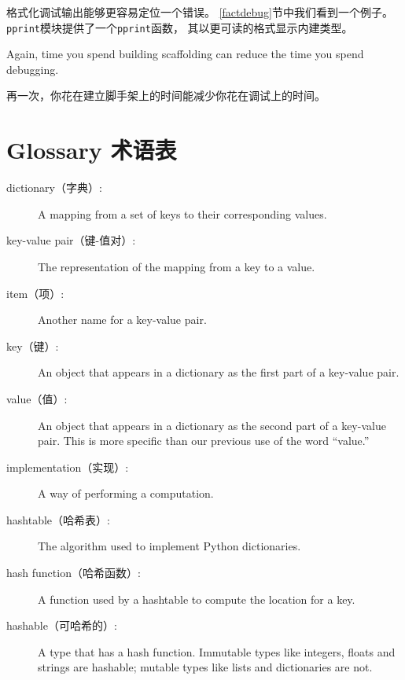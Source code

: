 \documentclass[10pt]{book}
\begin{document}
\begin{CJK}{UTF8}{gbsn}
\begin{description}
[美化打印输出：]格式化调试输出能够更容易定位一个错误。
\ref{factdebug}节中我们看到一个例子。
{\tt pprint}模块提供了一个{\tt pprint}函数，
其以更可读的格式显示内建类型。

\end{description}

Again, time you spend building scaffolding can reduce
the time you spend debugging.

再一次，你花在建立脚手架上的时间能减少你花在调试上的时间。

\section{Glossary 术语表}

\begin{description}

\item[dictionary（字典）:] A mapping from a set of keys to their
corresponding values.

\item[key-value pair（键-值对）:] The representation of the mapping from
a key to a value.

\item[item（项）:] Another name for a key-value pair.

\item[key（键）:] An object that appears in a dictionary as the
first part of a key-value pair.

\item[value（值）:] An object that appears in a dictionary as the
second part of a key-value pair.  This is more specific than
our previous use of the word ``value.''

\item[implementation（实现）:] A way of performing a computation.

\item[hashtable（哈希表）:] The algorithm used to implement Python
dictionaries.

\item[hash function（哈希函数）:] A function used by a hashtable to compute the
location for a key.

\item[hashable（可哈希的）:] A type that has a hash function.  Immutable
types like integers,
floats and strings are hashable; mutable types like lists and
dictionaries are not.


\end{description}
\end{CJK}
\end{document}
